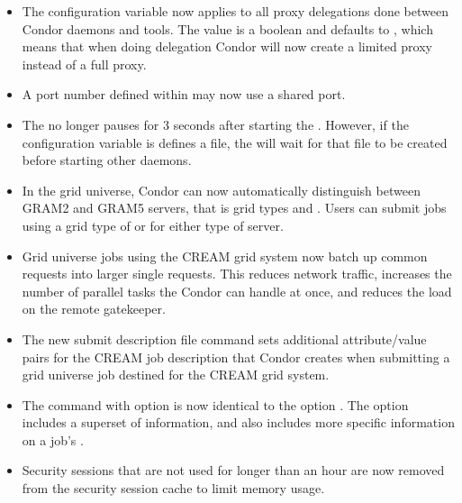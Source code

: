 \begin{itemize}

\item The configuration variable
 now applies to all proxy
delegations done between Condor daemons and tools.
The value is a boolean and defaults to ,
which means that when doing delegation Condor will now create a limited proxy
instead of a full proxy.

\item A port number defined within  may now use 
  a shared port.

\item The  no longer pauses for 3 seconds after starting
  the .  However, if the configuration variable
   is defines a file, 
  the  will wait for that file to be created
  before starting other daemons.

\item In the grid universe, Condor can now automatically distinguish
between GRAM2 and GRAM5 servers, that is grid types  and
.
Users can submit jobs using a grid type of  or 
for either type of server.

\item Grid universe jobs using the CREAM grid system now batch up
common requests into larger single requests.  This
reduces network traffic, increases the number of parallel tasks
the Condor can handle at once, and reduces the load on the remote
gatekeeper.

\item The new submit description file command 
sets additional attribute/value pairs for the CREAM job description
that Condor creates when submitting a grid universe job 
destined for the CREAM grid system.

\item The  command with option  is now identical to
the option .
The  option includes a superset of information,
and also includes more specific information on a job's .

\item Security sessions that are not used for longer than an hour are
now removed from the security session cache to limit memory usage.


\end{itemize}
